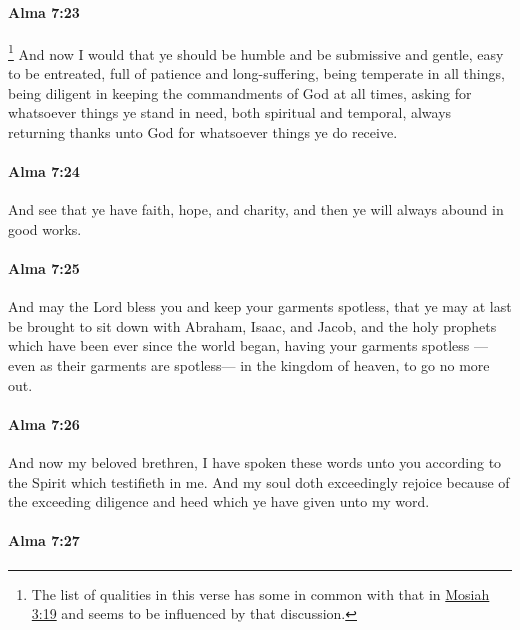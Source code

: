 		\paragraph{Alma 7:23} %
			\label{ALMA-7-23}

				\footnote{%
					The list of qualities in this verse has some in common with that in \hyperref[MOSIAH-3-19]{Mosiah 3:19} and seems to be influenced by that discussion.
					}%
			And now I would that ye should be humble and be submissive and gentle,
			easy to be entreated,
			full of patience and long-suffering,
			being temperate in all things,
			being diligent in keeping the commandments of God at all times,
			asking for whatsoever things ye stand in need, both spiritual and temporal,
			always returning thanks unto God for whatsoever things ye do receive.

		\paragraph{Alma 7:24} %
			\label{ALMA-7-24}

			And see that ye have faith, hope, and charity,
			and then ye will always abound in good works.

		\paragraph{Alma 7:25} %
			\label{ALMA-7-25}

			And may the Lord bless you and keep your garments spotless,
			that ye may at last be brought to sit down with Abraham, Isaac, and Jacob,
			and the holy prophets which have been ever since the world began,
			having your garments spotless
			---even as their garments are spotless---
			in the kingdom of heaven, to go no more out.

		\paragraph{Alma 7:26} %
			\label{ALMA-7-26}

			And now my beloved brethren, I have spoken these words unto you
			according to the Spirit which testifieth in me.
			And my soul doth exceedingly rejoice
			because of the exceeding diligence and heed
			which ye have given unto my word.

		\paragraph{Alma 7:27} %
			\label{ALMA-7-27}

